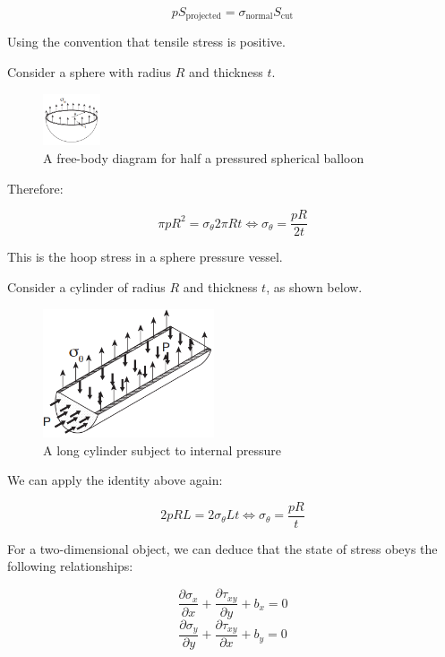\documentclass{article}
\begin{document}
\[ pS_{\text{projected}} = \sigma_{\text{normal}}S_{\text{cut}} \]

Using the convention that tensile stress is positive.

\begin{example}
    Consider a sphere with radius $R$ and thickness $t$.

    \begin{figure}[h]
        \centering
        \includegraphics[width = 0.15\textwidth]{images/stress4.png}
        \caption{A free-body diagram for half a pressured spherical balloon}
        \label{fig:enter-label}
    \end{figure}

    Therefore:

    \[ \pi pR^2 = \sigma_\theta 2\pi Rt \iff \sigma_\theta = \frac{pR}{2t} \]

    This is the hoop stress in a sphere pressure vessel.
\end{example}

\begin{example}
    Consider a cylinder of radius $R$ and thickness $t$, as shown below.

    \begin{figure}[h]
        \centering
        \includegraphics[width = 0.45\textwidth]{images/stress5.png}
        \caption{A long cylinder subject to internal pressure}
        \label{fig:enter-label}
    \end{figure}

    We can apply the identity above again:

    \[ 2pRL = 2\sigma_\theta Lt \iff \sigma_\theta = \frac{pR}{t}  \]
\end{example}

\begin{proposition}
    For a two-dimensional object, we can deduce that the state of stress obeys the following relationships:

    \[ \frac{\partial \sigma_x}{\partial x} + \frac{\partial \tau_{xy}}{\partial y} + b_x = 0 \]
    \[ \frac{\partial \sigma_y}{\partial y} + \frac{\partial \tau_{xy}}{\partial x} + b_y = 0 \]
\end{proposition}
\end{document}
